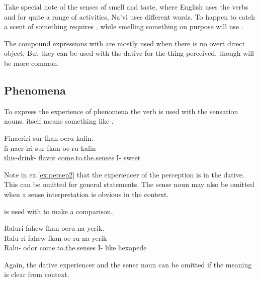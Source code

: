\noindent Take special note of the senses of smell and taste, where
English uses the verbs  and  for quite a range of
activities, Na'vi uses different words.  To happen to catch a scent of
something requires , while smelling something on purpose will
use .

The compound expressions with  are mostly used when there is
no overt direct object,    But they can
be used with the dative for the thing perceived,   though   will
be more common.

\subsection{Phenomena}   
To express the experience of phenomena the verb  is used with
the sensation nouns.   itself means something like
.

\begin{interlin} \label{ex:percep2}
\glll Fìnaerìri sur fkan oeru kalin. \\
    fì-naer-ìri sur fkan oe-ru kalin \\
  this-drink- flavor come.to.the.senses I- sweet \\
 \Ipawl{}
\end{interlin}

\noindent Note in ex.\ref{ex:percep2} that the experiencer of the
perception is in the dative.  This can be omitted for general
statements.  The sense noun may also be omitted when a sense
interpretation is obvious in the context.

 is used with   to make a comparison,

\begin{interlin}
\glll Raluri fahew fkan oeru na yerik. \\
    Ralu-ri fahew fkan oe-ru na yerik \\
    Ralu- odor come.to.the.senses I- like hexapede \\
 \Ipawl{}
\end{interlin}

\noindent Again, the dative experiencer and the sense noun can be
omitted if the meaning is clear from context.
